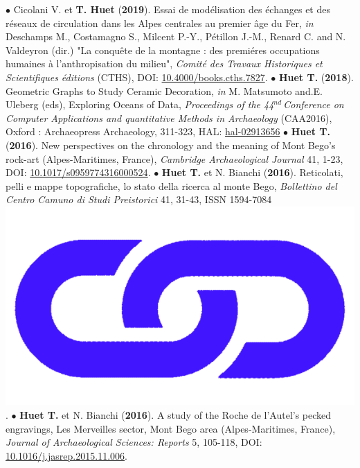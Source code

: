 \documentclass{article}
\begin{document}
{\smallbreak
$\bullet$ Cicolani V. et \textbf{T. Huet} (\textbf{2019}). Essai de mod\'{e}lisation des \'{e}changes et des r\'{e}seaux de circulation dans les Alpes centrales au premier \^{a}ge du Fer, \textit{in} Deschamps M., Costamagno S., Milcent P.-Y., Pétillon J.-M., Renard C. and N. Valdeyron (dir.) "La conqu\^{e}te de la montagne : des premi\'{e}res occupations humaines \`{a} l'anthropisation du milieu", \textit{Comit\'{e} des Travaux Historiques et Scientifiques \'{e}ditions} (CTHS), DOI: \href{https://books.openedition.org/cths/7827}{10.4000/books.cths.7827}.
\smallbreak
$\bullet$ \textbf{Huet T.} (\textbf{2018}). Geometric Graphs to Study Ceramic Decoration, \textit{in} M. Matsumoto and.E. Uleberg (eds), Exploring Oceans of Data, \textit{Proceedings of the 44${}^{nd\ }$Conference on Computer Applications and quantitative Methods in Archaeology} (CAA2016), Oxford : Archaeopress Archaeology, 311-323, HAL: \href{https://hal.archives-ouvertes.fr/hal-02913656}{hal-02913656}
\smallbreak
$\bullet$ \textbf{Huet T.} (\textbf{2016}). New perspectives on the chronology and the meaning of Mont Bego's rock-art (Alpes-Maritimes, France), \textit{Cambridge Archaeological Journal} 41, 1-23, DOI: \href{https://doi.org/10.1017/s0959774316000524}{10.1017/s0959774316000524}.
\smallbreak
$\bullet$ \textbf{Huet T.} et N. Bianchi (\textbf{2016}). Reticolati, pelli e mappe topografiche, lo stato della ricerca al monte Bego, \textit{Bollettino del Centro Camuno di Studi Preistorici} 41, 31-43, ISSN 1594-7084 \href{http://www.ccsp.it/web/infoccsp/bcsp/bcsp41_preview.pdf}{\includegraphics[scale=0.02]{link_darkblue.png}}.
\smallbreak
$\bullet$ \textbf{Huet T.} et N. Bianchi (\textbf{2016}). A study of the Roche de l'Autel's pecked engravings, Les Merveilles sector, Mont Bego area (Alpes-Maritimes, France), \textit{Journal of Archaeological Sciences: Reports} 5, 105-118, DOI: \href{https://doi.org/10.1016/j.jasrep.2015.11.006}{10.1016/j.jasrep.2015.11.006}.
}
\end{document}
